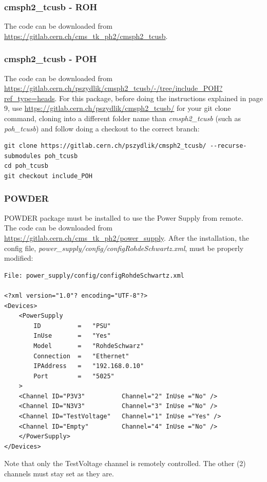 \documentclass[10pt,a4paper]{article}
\begin{document}
\subsubsection{cmsph2\_tcusb - ROH} 
\label{roh_tcusb}

The code can be downloaded from \url{https://gitlab.cern.ch/cms_tk_ph2/cmsph2_tcusb}.

\subsubsection{cmsph2\_tcusb - POH} 
\label{poh_tcusb}

The code can be downloaded from \url{https://gitlab.cern.ch/pszydlik/cmsph2_tcusb/-/tree/include_POH?ref_type=heads}. For this package, before doing the instructions explained in page 9, use \url{https://gitlab.cern.ch/pszydlik/cmsph2_tcusb/} for your git clone command, cloning into a different folder name than \emph{cmsph2\_tcusb} (such as \emph{poh\_tcusb}) and follow doing a checkout to the correct branch: 

\begin{framed}
\begin{verbatim}
git clone https://gitlab.cern.ch/pszydlik/cmsph2_tcusb/ --recurse-submodules poh_tcusb
cd poh_tcusb
git checkout include_POH
\end{verbatim}
\end{framed}

\subsubsection{POWDER}
\label{powder}

POWDER package must be installed to use the Power Supply from remote. \\
The code can be downloaded from \url{https://gitlab.cern.ch/cms_tk_ph2/power_supply}.
After the installation, the config file, \emph{power\_supply/config/configRohdeSchwartz.xml}, must be properly modified:
\begin{framed}
\begin{verbatim}
File: power_supply/config/configRohdeSchwartz.xml

<?xml version="1.0"? encoding="UTF-8"?>
<Devices>
    <PowerSupply
        ID          =   "PSU"
        InUse       =   "Yes"
        Model       =   "RohdeSchwarz"
        Connection  =   "Ethernet"
        IPAddress   =   "192.168.0.10"
        Port        =   "5025"
    >
    <Channel ID="P3V3"          Channel="2" InUse ="No" />
    <Channel ID="N3V3"          Channel="3" InUse ="No" />
    <Channel ID="TestVoltage"   Channel="1" InUse ="Yes" />
    <Channel ID="Empty"         Channel="4" InUse ="No" />
    </PowerSupply>
</Devices>

\end{verbatim}
\end{framed}
Note that only the TestVoltage channel is remotely controlled. The other (2) channels must stay set as they are.
\end{document}
